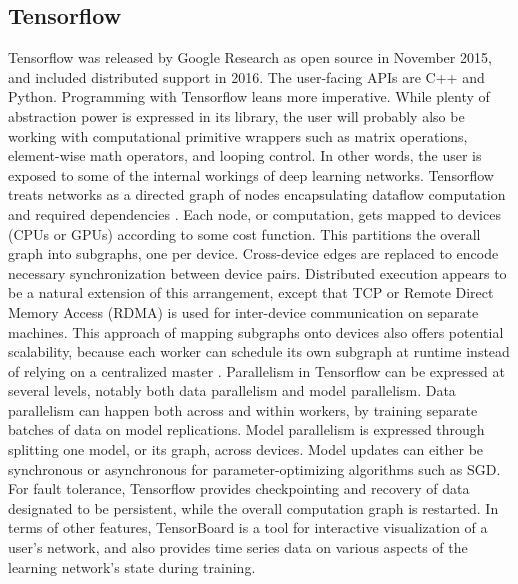 \documentclass{article}
\begin{document}
\subsection{Tensorflow}
Tensorflow was released by Google Research as open source in November 2015, and included distributed support in 2016. The user-facing APIs are C++ and Python. Programming with Tensorflow leans more imperative. While plenty of abstraction power is expressed in its library, the user will probably also be working with computational primitive wrappers such as matrix operations, element-wise math operators, and looping control. In other words, the user is exposed to some of the internal workings of deep learning networks. Tensorflow treats networks as a directed graph of nodes encapsulating dataflow computation and required dependencies \cite{DBLP:journals/corr/AbadiABBCCCDDDG16}. Each node, or computation, gets mapped to devices (CPUs or GPUs) according to some cost function. This partitions the overall graph into subgraphs, one per device. Cross-device edges are replaced to encode necessary synchronization between device pairs. Distributed execution appears to be a natural extension of this arrangement, except that TCP or Remote Direct Memory Access (RDMA) is used for inter-device communication on separate machines. This approach of mapping subgraphs onto devices also offers potential scalability, because each worker can schedule its own subgraph at runtime instead of relying on a centralized master \cite{DBLP:journals/corr/AbadiABBCCCDDDG16}. Parallelism in Tensorflow can be expressed at several levels, notably both data parallelism and model parallelism. Data parallelism can happen both across and within workers, by training separate batches of data on model replications. Model parallelism is expressed through splitting one model, or its graph, across devices. Model updates can either be synchronous or asynchronous for parameter-optimizing algorithms such as SGD. For fault tolerance, Tensorflow provides checkpointing and recovery of data designated to be persistent, while the overall computation graph is restarted. In terms of other features, TensorBoard is a tool for interactive visualization of a user's network, and also provides time series data on various aspects of the learning network's state during training. 
\end{document}
